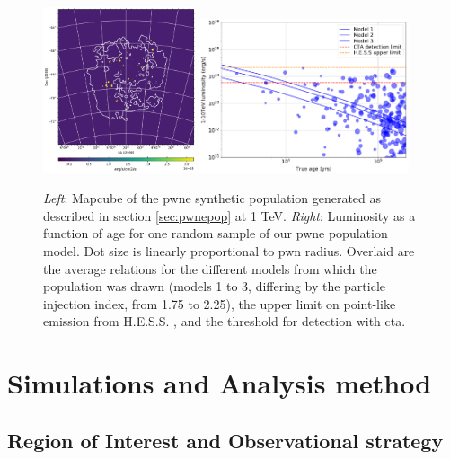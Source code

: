 \documentclass[main.tex]{subfiles}
\begin{document}
\begin{figure}[h!]
  \centering
  \includegraphics[width=0.4\textwidth]{Pictures/PWNe_1TeVmap.pdf}
  \includegraphics[width=0.55\textwidth]{Pictures/LMC-PWNe_lum-vs-age.pdf}
  \caption{ \textit{Left}: Mapcube of the \gls{pwne} synthetic population generated as described in section \ref{sec:pwnepop} at 1 TeV. \textit{Right}: Luminosity as a function of age for one random sample of our \gls{pwne} population model. Dot size is linearly proportional to \gls{pwn} radius. Overlaid are the average relations for the different models from which the population was drawn (models 1 to 3, differing by the particle injection index, from 1.75 to 2.25), the upper limit on point-like emission from H.E.S.S. \cite[using the limit on SN1987A from][]{Abramowski:2015}, and the threshold for detection with \gls{cta}.}
  \label{fig:mapcube_pwne}
\end{figure}

\section{Simulations and Analysis method} \label{sec:simana}

\subsection{Region of Interest and Observational strategy}
\end{document}
